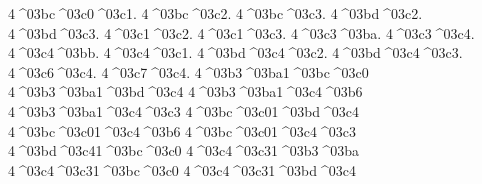 {4^^^^03bc^^^^03c0^^^^03c1. %
4^^^^03bc^^^^03c2.  %
4^^^^03bc^^^^03c3.
4^^^^03bd^^^^03c2.  %
4^^^^03bd^^^^03c3.
4^^^^03c1^^^^03c2.  %
4^^^^03c1^^^^03c3.
4^^^^03c3^^^^03ba.  %
4^^^^03c3^^^^03c4.  %
4^^^^03c4^^^^03bb.  %
4^^^^03c4^^^^03c1.  %
4^^^^03bd^^^^03c4^^^^03c2. %
4^^^^03bd^^^^03c4^^^^03c3.
4^^^^03c6^^^^03c4.  %
4^^^^03c7^^^^03c4.  %
4^^^^03b3^^^^03ba1^^^^03bc^^^^03c0
4^^^^03b3^^^^03ba1^^^^03bd^^^^03c4
4^^^^03b3^^^^03ba1^^^^03c4^^^^03b6
4^^^^03b3^^^^03ba1^^^^03c4^^^^03c3
4^^^^03bc^^^^03c01^^^^03bd^^^^03c4
4^^^^03bc^^^^03c01^^^^03c4^^^^03b6
4^^^^03bc^^^^03c01^^^^03c4^^^^03c3
4^^^^03bd^^^^03c41^^^^03bc^^^^03c0
4^^^^03c4^^^^03c31^^^^03b3^^^^03ba
4^^^^03c4^^^^03c31^^^^03bc^^^^03c0
4^^^^03c4^^^^03c31^^^^03bd^^^^03c4
} %
\endinput
